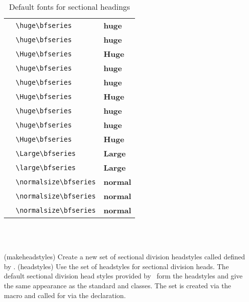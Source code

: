 \begin{table}
\centering
\caption{Default fonts for sectional headings}\label{tab:secfonts}
\begin{tabular}{lll} \toprule
\cmd{\booknamefont}       & \verb?\huge\bfseries? & \huge\bfseries huge \\
\cmd{\booknumfont}        & \verb?\huge\bfseries? & \huge\bfseries huge \\
\cmd{\booktitlefont}      & \verb?\Huge\bfseries? & \Huge\bfseries Huge \\
\cmd{\partnamefont}       & \verb?\huge\bfseries? & \huge\bfseries huge \\
\cmd{\partnumfont}        & \verb?\huge\bfseries? & \huge\bfseries huge \\
\cmd{\parttitlefont}      & \verb?\Huge\bfseries? & \Huge\bfseries Huge \\
\cmd{\chapnamefont}       & \verb?\huge\bfseries? & \huge\bfseries huge \\
\cmd{\chapnumfont}        & \verb?\huge\bfseries? & \huge\bfseries huge \\
\cmd{\chaptitlefont}      & \verb?\Huge\bfseries? & \Huge\bfseries Huge \\
\cmd{\secheadstyle}       & \verb?\Large\bfseries? & \Large\bfseries Large \\
\cmd{\subsecheadstyle}    & \verb?\large\bfseries? & \Large\bfseries Large \\
\cmd{\subsubsecheadstyle} & \verb?\normalsize\bfseries? & \bfseries normal \\
\cmd{\paraheadstyle}      & \verb?\normalsize\bfseries? & \bfseries normal \\
\cmd{\subparaheadstyle}   & \verb?\normalsize\bfseries? & \bfseries normal \\
\bottomrule
\end{tabular}
\end{table}

\begin{syntax}
\cmd{\makeheadstyles} \\
\cmd{\headstyles} \\
\end{syntax}
\glossary(makeheadstyles)%
  {}%
  {Create a new set of sectional division headstyles called  
   defined by .}
\glossary(headstyles)%
  {}%
  {Use the  set of headstyles for sectional division heads.}
The default sectional division head styles provided by \Mname\ form the
 headstyles and give the same appearance as the standard
 and  classes. The set is created via the
\cmd{\makeheadstyles} macro and called for via the  
declaration. 
\begin{lcode}
\end{lcode}

